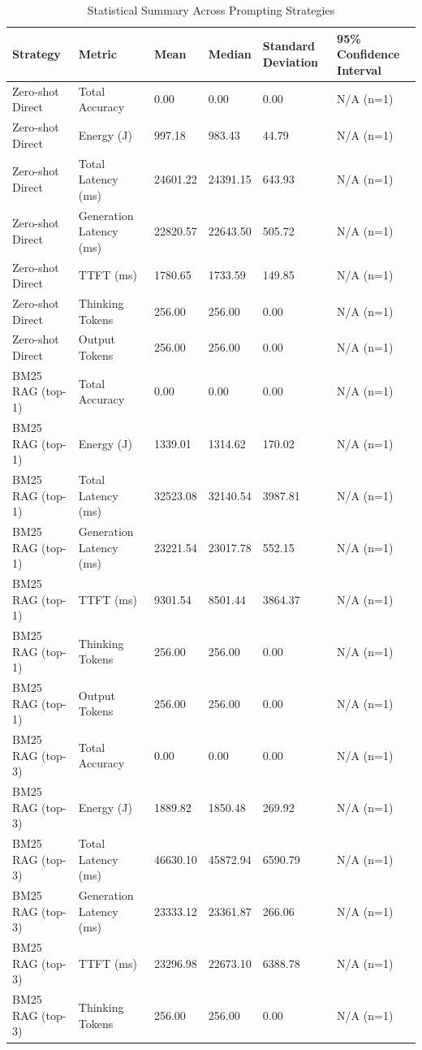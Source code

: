 \begin{table}
\caption{Statistical Summary Across Prompting Strategies}
\label{tab:statistical_summary}
\begin{tabular}{llllll}
\toprule
Strategy & Metric & Mean & Median & Standard Deviation & 95\% Confidence Interval \\
\midrule
Zero-shot Direct & Total Accuracy & 0.00 & 0.00 & 0.00 & N/A (n=1) \\
Zero-shot Direct & Energy (J) & 997.18 & 983.43 & 44.79 & N/A (n=1) \\
Zero-shot Direct & Total Latency (ms) & 24601.22 & 24391.15 & 643.93 & N/A (n=1) \\
Zero-shot Direct & Generation Latency (ms) & 22820.57 & 22643.50 & 505.72 & N/A (n=1) \\
Zero-shot Direct & TTFT (ms) & 1780.65 & 1733.59 & 149.85 & N/A (n=1) \\
Zero-shot Direct & Thinking Tokens & 256.00 & 256.00 & 0.00 & N/A (n=1) \\
Zero-shot Direct & Output Tokens & 256.00 & 256.00 & 0.00 & N/A (n=1) \\
BM25 RAG (top-1) & Total Accuracy & 0.00 & 0.00 & 0.00 & N/A (n=1) \\
BM25 RAG (top-1) & Energy (J) & 1339.01 & 1314.62 & 170.02 & N/A (n=1) \\
BM25 RAG (top-1) & Total Latency (ms) & 32523.08 & 32140.54 & 3987.81 & N/A (n=1) \\
BM25 RAG (top-1) & Generation Latency (ms) & 23221.54 & 23017.78 & 552.15 & N/A (n=1) \\
BM25 RAG (top-1) & TTFT (ms) & 9301.54 & 8501.44 & 3864.37 & N/A (n=1) \\
BM25 RAG (top-1) & Thinking Tokens & 256.00 & 256.00 & 0.00 & N/A (n=1) \\
BM25 RAG (top-1) & Output Tokens & 256.00 & 256.00 & 0.00 & N/A (n=1) \\
BM25 RAG (top-3) & Total Accuracy & 0.00 & 0.00 & 0.00 & N/A (n=1) \\
BM25 RAG (top-3) & Energy (J) & 1889.82 & 1850.48 & 269.92 & N/A (n=1) \\
BM25 RAG (top-3) & Total Latency (ms) & 46630.10 & 45872.94 & 6590.79 & N/A (n=1) \\
BM25 RAG (top-3) & Generation Latency (ms) & 23333.12 & 23361.87 & 266.06 & N/A (n=1) \\
BM25 RAG (top-3) & TTFT (ms) & 23296.98 & 22673.10 & 6388.78 & N/A (n=1) \\
BM25 RAG (top-3) & Thinking Tokens & 256.00 & 256.00 & 0.00 & N/A (n=1) \\

\end{tabular}
\end{table}
